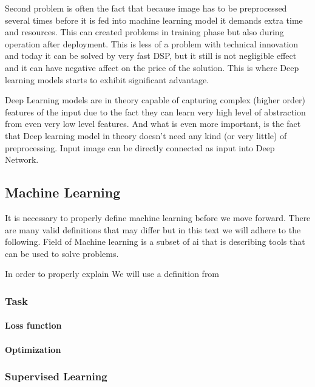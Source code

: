 \documentclass[11pt]{article}
\begin{document}
Second problem is often the fact that because image has to be preprocessed several times before it is fed into machine learning model it demands extra time and resources. This can created problems in training phase but also during operation after deployment.
This is less of a problem with technical innovation and today it can be solved by very fast DSP, but it still is not negligible effect and it can have negative affect on the price of the solution. This is where Deep learning models starts to exhibit significant advantage.

Deep Learning models are in theory capable of capturing complex (higher order) features of the input due to the fact they can learn very high level of abstraction from even very low level features. And what is even more important, is the fact that Deep learning model in theory doesn't need any kind (or very little) of preprocessing. Input image can be directly connected as input into Deep Network.
\subsection{Machine Learning}
\label{sec:org3a1d41e}
It is necessary to properly define machine learning before we move forward. There are many valid definitions that may differ but in this text we will adhere  to the following.
Field of Machine learning is a subset of \gls{ai} that is describing tools that can be used to solve problems.

   In order to properly explain
We will use a definition from \cite{book--goodfellow--2016}

\subsubsection{Task}
\label{sec:org088175f}

\paragraph{Loss function}
\label{sec:org709136b}

\paragraph{Optimization}
\label{sec:org129415b}

\subsubsection{Supervised Learning}
\label{sec:org3765f22}
\end{document}
